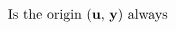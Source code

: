 \documentclass[preview]{standalone}
\begin{document}
\begin{align*}
\text{Is the origin (\textbf{u}, \textbf{y}) always}
\end{align*}
\end{document}
